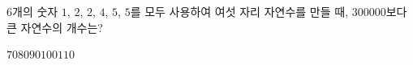 $6$개의 숫자 $1$, $2$, $2$, $4$, $5$, $5$를 모두 사용하여 여섯 자리 자연수를 만들 때, $300000$보다 큰 자연수의 개수는?
\begin{choices32}{$70$}{$80$}{$90$}{$100$}{$110$}\end{choices32}
